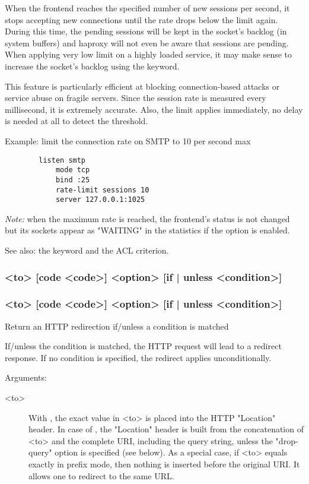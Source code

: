 {  When the frontend reaches the specified number of new sessions per second, it
  stops accepting new connections until the rate drops below the limit again.
  During this time, the pending sessions will be kept in the socket's backlog
  (in system buffers) and haproxy will not even be aware that sessions are
  pending. When applying very low limit on a highly loaded service, it may make
  sense to increase the socket's backlog using the  keyword.

  This feature is particularly efficient at blocking connection-based attacks
  or service abuse on fragile servers. Since the session rate is measured every
  millisecond, it is extremely accurate. Also, the limit applies immediately,
  no delay is needed at all to detect the threshold.

  Example: limit the connection rate on SMTP to 10 per second max
  \begin{verbatim} 
        listen smtp
            mode tcp
            bind :25
            rate-limit sessions 10
            server 127.0.0.1:1025
  \end{verbatim}

  \emph{Note:} when the maximum rate is reached, the frontend's status is not changed
         but its sockets appear as "WAITING" in the statistics if the
          option is enabled.

  See also: the  keyword and the  ACL criterion.

\subsubsection[redirect location] { <to> [code <code>] <option> [{if | unless} <condition>]}
\subsubsection[redirect prefix] { <to> [code <code>] <option> [{if | unless} <condition>]}

  Return an HTTP redirection if/unless a condition is matched


  If/unless the condition is matched, the HTTP request will lead to a redirect
  response. If no condition is specified, the redirect applies unconditionally.

  Arguments:
  \begin{description}
  \item[<to>]
              With , the exact value in <to> is placed into
              the HTTP "Location" header. In case of , the
              "Location" header is built from the concatenation of <to> and the
              complete URI, including the query string, unless the "drop-query"
              option is specified (see below). As a special case, if <to>
              equals exactly \chr{/} in prefix mode, then nothing is inserted
              before the original URI. It allows one to redirect to the same
              URL.


\end{description}}
